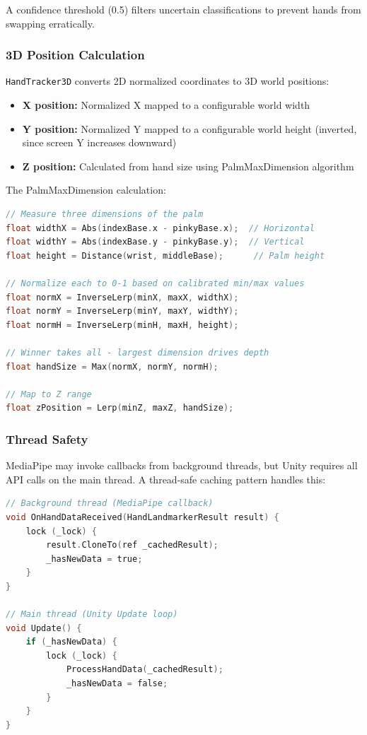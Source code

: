 \documentclass[11pt]{article}
\begin{document}
A confidence threshold (0.5) filters uncertain classifications to prevent hands from swapping erratically.

\subsubsection{3D Position Calculation}

\texttt{HandTracker3D} converts 2D normalized coordinates to 3D world positions:

\begin{itemize}
    \item \textbf{X position:} Normalized X mapped to a configurable world width
    \item \textbf{Y position:} Normalized Y mapped to a configurable world height (inverted, since screen Y increases downward)
    \item \textbf{Z position:} Calculated from hand size using PalmMaxDimension algorithm
\end{itemize}

The PalmMaxDimension calculation:

\begin{lstlisting}[language=C, caption=PalmMaxDimension Algorithm]
// Measure three dimensions of the palm
float widthX = Abs(indexBase.x - pinkyBase.x);  // Horizontal
float widthY = Abs(indexBase.y - pinkyBase.y);  // Vertical
float height = Distance(wrist, middleBase);      // Palm height

// Normalize each to 0-1 based on calibrated min/max values
float normX = InverseLerp(minX, maxX, widthX);
float normY = InverseLerp(minY, maxY, widthY);
float normH = InverseLerp(minH, maxH, height);

// Winner takes all - largest dimension drives depth
float handSize = Max(normX, normY, normH);

// Map to Z range
float zPosition = Lerp(minZ, maxZ, handSize);
\end{lstlisting}

\subsubsection{Thread Safety}

MediaPipe may invoke callbacks from background threads, but Unity requires all API calls on the main thread. A thread-safe caching pattern handles this:

\begin{lstlisting}[language=C, caption=Thread-Safe Data Transfer]
// Background thread (MediaPipe callback)
void OnHandDataReceived(HandLandmarkerResult result) {
    lock (_lock) {
        result.CloneTo(ref _cachedResult);
        _hasNewData = true;
    }
}

// Main thread (Unity Update loop)
void Update() {
    if (_hasNewData) {
        lock (_lock) {
            ProcessHandData(_cachedResult);
            _hasNewData = false;
        }
    }
}
\end{lstlisting}
\end{document}
